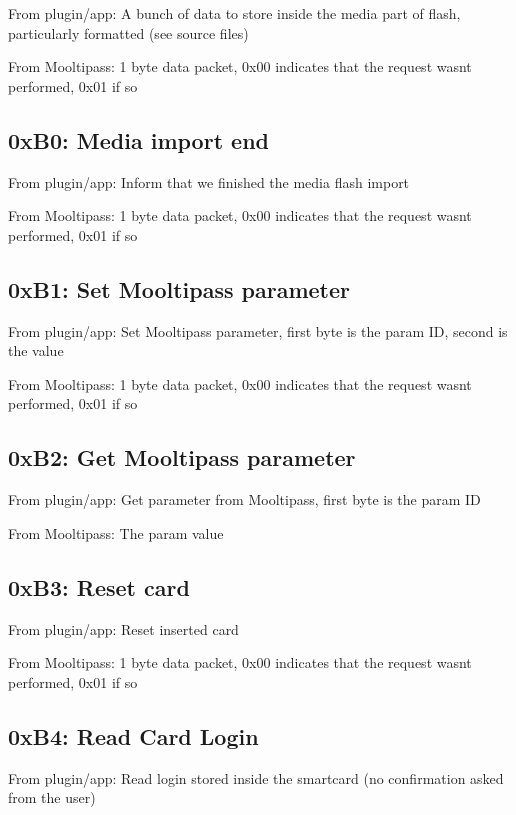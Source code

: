 From plugin/app\+: A bunch of data to store inside the media part of flash, particularly formatted (see source files)

From Mooltipass\+: 1 byte data packet, 0x00 indicates that the request wasn\textquotesingle{}t performed, 0x01 if so

\subsection*{0x\+B0\+: Media import end }

From plugin/app\+: Inform that we finished the media flash import

From Mooltipass\+: 1 byte data packet, 0x00 indicates that the request wasn\textquotesingle{}t performed, 0x01 if so

\subsection*{0x\+B1\+: Set Mooltipass parameter }

From plugin/app\+: Set Mooltipass parameter, first byte is the param ID, second is the value

From Mooltipass\+: 1 byte data packet, 0x00 indicates that the request wasn\textquotesingle{}t performed, 0x01 if so

\subsection*{0x\+B2\+: Get Mooltipass parameter }

From plugin/app\+: Get parameter from Mooltipass, first byte is the param ID

From Mooltipass\+: The param value

\subsection*{0x\+B3\+: Reset card }

From plugin/app\+: Reset inserted card

From Mooltipass\+: 1 byte data packet, 0x00 indicates that the request wasn\textquotesingle{}t performed, 0x01 if so

\subsection*{0x\+B4\+: Read Card Login }

From plugin/app\+: Read login stored inside the smartcard (no confirmation asked from the user)

